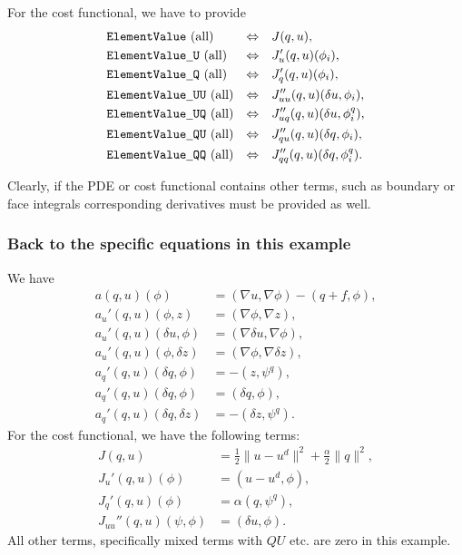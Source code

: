 For the cost functional, we have to provide{\color{red}
\begin{align*}
&\texttt{ElementValue}\text{ (all)}   &\Leftrightarrow &\quad J(q,u), \\
&\texttt{ElementValue\underline{ }U}\text{ (all)}    &\Leftrightarrow &\quad J_u'(q,u)(\phi_i), \\
&\texttt{ElementValue\underline{ }Q}\text{ (all)}    &\Leftrightarrow &\quad J_q'(q,u)(\phi_i), \\
&\texttt{ElementValue\underline{ }UU}\text{ (all)}  &\Leftrightarrow &\quad J_{uu}''(q,u)(\delta u, \phi_i), \\
&\texttt{ElementValue\underline{ }UQ}\text{ (all)}  &\Leftrightarrow &\quad J_{uq}''(q,u)(\delta u, \phi^q_i), \\
&\texttt{ElementValue\underline{ }QU}\text{ (all)}   &\Leftrightarrow &\quad J_{qu}''(q,u)(\delta q, \phi_i), \\
&\texttt{ElementValue\underline{ }QQ}\text{ (all)}  &\Leftrightarrow &\quad J_{qq}''(q,u)(\delta q, \phi^q_i).
\end{align*}}

Clearly, if the PDE or cost functional contains other terms, such as boundary or face integrals 
corresponding derivatives must be provided as well.

\subsubsection{Back to the specific equations in this example}
We have
\begin{align*}
a(q,u)(\phi) &= (\nabla u, \nabla\phi) - (q + f, \phi),\\
a_u'(q,u)(\phi, z) &= (\nabla\phi, \nabla z),\\
a_u'(q,u)(\delta u, \phi) &= (\nabla\delta u, \nabla\phi),\\
a_u'(q,u)(\phi, \delta z) &= (\nabla\phi, \nabla\delta z),\\
a_q'(q,u)(\delta q, \phi) &= -(z,\psi^q),\\
a_q'(q,u)(\delta q, \phi) &= (\delta q,\phi),\\
a_{q}'(q,u)(\delta q,\delta z) &= - (\delta z,\psi^q).
\end{align*}
%
For the cost functional, we have the following terms:
\begin{align*}
J(q,u) &= \frac{1}{2} \|u-u^d\|^2 + \frac{\alpha}{2}\|q\|^2,\\
J_u'(q,u)(\phi) &= (u-u^d, \phi),\\
J_q'(q,u)(\phi) &= \alpha (q,\psi^q),\\
J_{uu}''(q,u)(\psi, \phi) &= (\delta u, \phi).
\end{align*}
All other terms, specifically mixed terms with $QU$ etc. are zero in this
example. 

